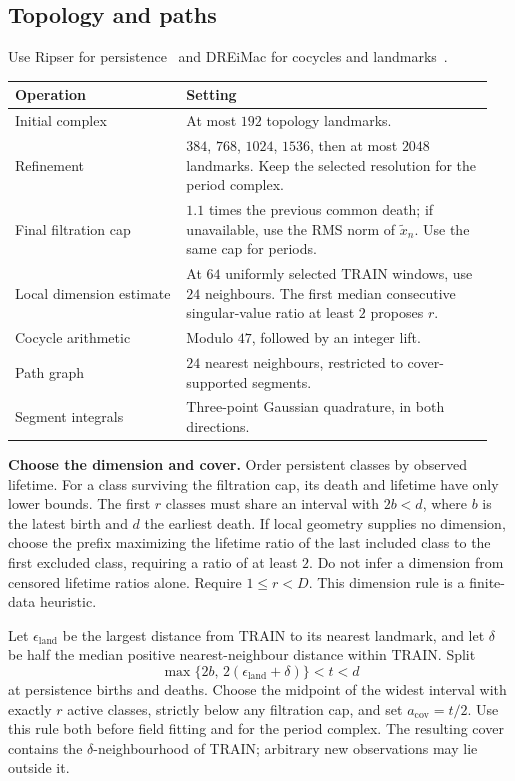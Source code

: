 \documentclass[11pt,a4paper]{article}
\begin{document}
\subsection*{Topology and paths}
Use Ripser for persistence~\citep{Bauer2021} and DREiMac for cocycles and
landmarks~\citep{Perea2023}.
\begin{center}
\begin{tabular}{@{}p{0.34\linewidth}p{0.61\linewidth}@{}}
\toprule
Operation & Setting\\
\midrule
Initial complex & At most $192$ topology landmarks.\\
Refinement & $384$, $768$, $1024$, $1536$, then at most $2048$ landmarks.
Keep the selected resolution for the period complex.\\
Final filtration cap & $1.1$ times the previous common death; if unavailable,
use the RMS norm of $\widetilde x_n$. Use the same cap for periods.\\
Local dimension estimate & At $64$ uniformly selected TRAIN windows,
use $24$ neighbours. The first median consecutive singular-value ratio
at least $2$ proposes $r$.\\
Cocycle arithmetic & Modulo $47$, followed by an integer lift.\\
Path graph & $24$ nearest neighbours, restricted to cover-supported segments.\\
Segment integrals & Three-point Gaussian quadrature, in both directions.\\
\bottomrule
\end{tabular}
\end{center}

\textbf{Choose the dimension and cover.}
Order persistent classes by observed lifetime. For a class surviving the
filtration cap, its death and lifetime have only lower bounds.
The first $r$ classes must share an interval with $2b<d$, where $b$ is
the latest birth and $d$ the earliest death.
If local geometry supplies no dimension, choose the prefix maximizing the lifetime ratio of the last included
class to the first excluded class, requiring a ratio of at least $2$.
Do not infer a dimension from censored lifetime ratios alone.
Require $1\le r<D$. This dimension rule is a finite-data heuristic.

Let $\epsilon_{\mathrm{land}}$ be the largest distance from TRAIN to its
nearest landmark, and let $\delta$ be half the median positive nearest-neighbour
distance within TRAIN. Split
\[
\max\{2b,\,2(\epsilon_{\mathrm{land}}+\delta)\}<t<d
\]
at persistence births and deaths. Choose the midpoint of the widest
interval with exactly $r$ active classes, strictly below any filtration
cap, and set $a_{\mathrm{cov}}=t/2$.
Use this rule both before field fitting and for the period complex.
The resulting cover contains the $\delta$-neighbourhood of TRAIN;
arbitrary new observations may lie outside it.
\end{document}
